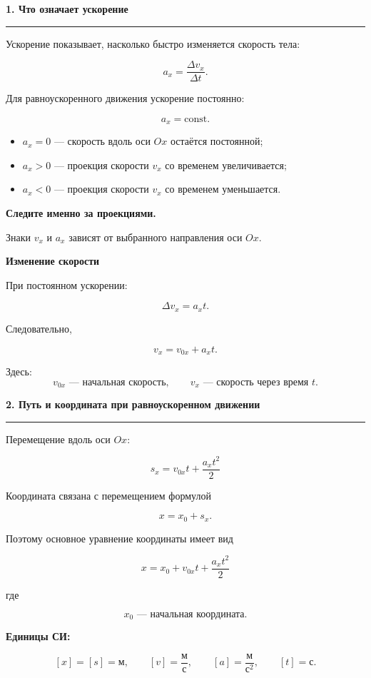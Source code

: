 \documentclass[a4paper,12pt]{article}
\newcommand{\sectiontitle}[1]{%
  \vspace{2mm}
  {\Large\bfseries\color{darkaccent}#1}\par
  \vspace{1mm}
  {\color{accent}\rule{\linewidth}{0.5pt}}
  \vspace{3mm}
}
\newcommand{\subsectiontitle}[1]{%
  \vspace{2mm}
  {\large\bfseries\color{darkaccent}#1}\par
  \vspace{1mm}
}
\newcommand{\important}[1]{%
  {\bfseries\color{darkaccent}#1}
}
\begin{document}
\clearpage

\sectiontitle{1. Что означает ускорение}

Ускорение показывает, насколько быстро изменяется скорость тела:

\[
a_x=\frac{\Delta v_x}{\Delta t}.
\]

Для равноускоренного движения ускорение постоянно:

\[
a_x=\text{const}.
\]

\begin{itemize}
  \item \(a_x=0\) --- скорость вдоль оси \(Ox\) остаётся постоянной;
  \item \(a_x>0\) --- проекция скорости \(v_x\) со временем увеличивается;
  \item \(a_x<0\) --- проекция скорости \(v_x\) со временем уменьшается.
\end{itemize}

\important{Следите именно за проекциями.}
Знаки \(v_x\) и \(a_x\) зависят от выбранного направления оси \(Ox\).

\subsectiontitle{Изменение скорости}

При постоянном ускорении:

\[
\Delta v_x=a_x t.
\]

Следовательно,

\[
v_x=v_{0x}+a_x t.
\]

Здесь:
\[
v_{0x} \text{ --- начальная скорость},\qquad
v_x \text{ --- скорость через время }t.
\]

\sectiontitle{2. Путь и координата при равноускоренном движении}

Перемещение вдоль оси \(Ox\):

\[
\boxed{
s_x=v_{0x}t+\frac{a_xt^2}{2}
}
\]

Координата связана с перемещением формулой

\[
x=x_0+s_x.
\]

Поэтому основное уравнение координаты имеет вид

\[
\boxed{
x=x_0+v_{0x}t+\frac{a_xt^2}{2}
}
\]

где

\[
x_0 \text{ --- начальная координата}.
\]

\important{Единицы СИ:}

\[
[x]=[s]=\text{м},\qquad
[v]=\frac{\text{м}}{\text{с}},\qquad
[a]=\frac{\text{м}}{\text{с}^2},\qquad
[t]=\text{с}.
\]
\end{document}
